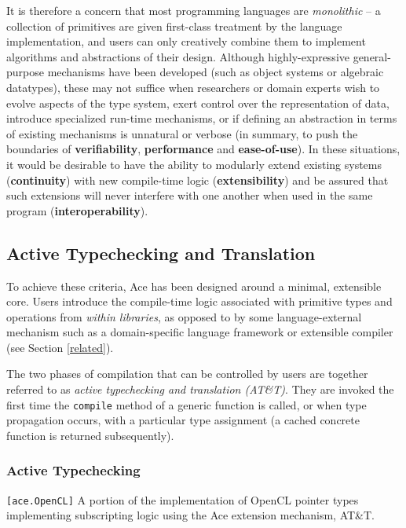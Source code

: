 \documentclass[9pt,preprint]{sigplanconf}
\begin{document}
It is therefore a concern that most programming languages are {\em monolithic} -- a collection of primitives are given first-class treatment by the language implementation, and users can only creatively combine them to implement algorithms and abstractions of their design. Although highly-expressive general-purpose mechanisms have been developed (such as object systems or algebraic datatypes), these may not suffice when researchers or domain experts wish to evolve aspects of the type system, exert control over the representation of data, introduce specialized run-time mechanisms, or if defining an abstraction in terms of existing mechanisms is unnatural or verbose (in summary, to push the boundaries of \textbf{verifiability}, \textbf{performance} and \textbf{ease-of-use}). In these situations, it would be desirable to have the ability to modularly extend existing systems (\textbf{continuity}) with new compile-time logic (\textbf{extensibility}) and be assured that such extensions will never interfere with one another when used in the same program (\textbf{interoperability}).

\subsection{Active Typechecking and Translation}
To achieve these criteria, Ace has been designed around a minimal, {extensible} core. Users introduce the compile-time logic associated with primitive types and operations from \emph{within libraries}, as opposed to by some language-external mechanism such as a domain-specific language framework or extensible compiler (see Section \ref{related}). 

The two phases of compilation that can be controlled by users are together referred to as \emph{active typechecking and translation (AT\&T)}. They are invoked the first time the \verb|compile| method of a generic function is called, or when type propagation occurs, with a particular type assignment (a cached concrete function is returned subsequently).

\subsubsection{Active Typechecking}
\begin{codelisting}

\caption{\texttt{[ace.OpenCL]} A portion of the implementation of OpenCL pointer types implementing subscripting logic using the Ace extension mechanism, AT\&T.}
\label{pointers}
\end{codelisting}
\end{document}
